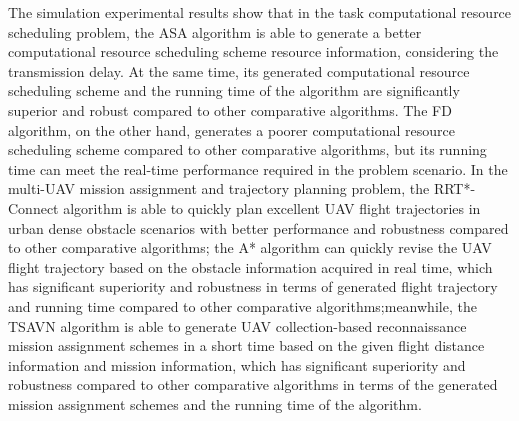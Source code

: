 \begin{abstracten}
The simulation experimental results show that 
in the task computational resource scheduling problem, the ASA algorithm is able to generate a better computational resource scheduling scheme resource information, considering the transmission delay. At the same time, its generated computational resource scheduling scheme and the running time of the algorithm are significantly superior and robust compared to other comparative algorithms. The FD algorithm, on the other hand, generates a poorer computational resource scheduling scheme compared to other comparative algorithms, but its running time can meet the real-time performance required in the problem scenario.
In the multi-UAV mission assignment and trajectory planning problem, the RRT*-Connect algorithm is able to quickly plan excellent UAV flight trajectories in urban dense obstacle scenarios with better performance and robustness compared to other comparative algorithms; the A* algorithm can quickly revise the UAV flight trajectory based on the obstacle information acquired in real time, which has significant superiority and robustness in terms of generated flight trajectory and running time compared to other comparative algorithms;meanwhile, the TSAVN algorithm is able to generate UAV collection-based reconnaissance mission assignment schemes in a short time based on the given flight distance information and mission information, which has significant superiority and robustness compared to other comparative algorithms in terms of the generated mission assignment schemes and the running time of the algorithm.

\end{abstracten}
